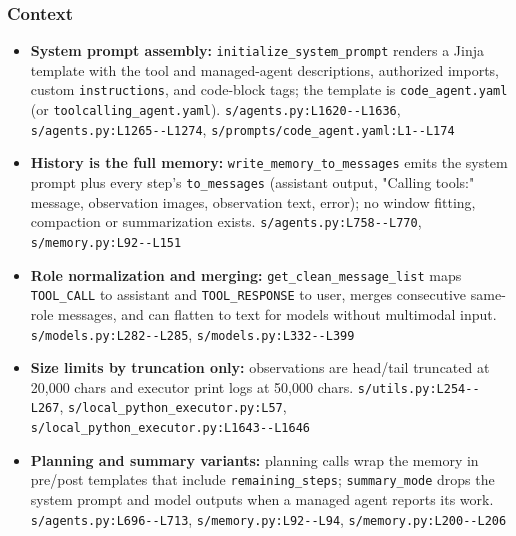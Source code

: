 \subsubsection*{Context}
\begin{itemize}
\item \textbf{System prompt assembly:} \texttt{initialize\_\allowbreak{}system\_\allowbreak{}prompt} renders a Jinja template with the tool and managed-agent descriptions, authorized imports, custom \texttt{instructions}, and code-block tags; the template is \texttt{code\_\allowbreak{}agent.\allowbreak{}yaml} (or \texttt{toolcalling\_\allowbreak{}agent.\allowbreak{}yaml}). \texttt{s/\allowbreak{}agents.\allowbreak{}py:\allowbreak{}L1620-\allowbreak{}-\allowbreak{}L1636}, \texttt{s/\allowbreak{}agents.\allowbreak{}py:\allowbreak{}L1265-\allowbreak{}-\allowbreak{}L1274}, \texttt{s/\allowbreak{}prompts/\allowbreak{}code\_\allowbreak{}agent.\allowbreak{}yaml:\allowbreak{}L1-\allowbreak{}-\allowbreak{}L174}
\item \textbf{History is the full memory:} \texttt{write\_\allowbreak{}memory\_\allowbreak{}to\_\allowbreak{}messages} emits the system prompt plus every step's \texttt{to\_\allowbreak{}messages} (assistant output, "Calling tools:" message, observation images, observation text, error); no window fitting, compaction or summarization exists. \texttt{s/\allowbreak{}agents.\allowbreak{}py:\allowbreak{}L758-\allowbreak{}-\allowbreak{}L770}, \texttt{s/\allowbreak{}memory.\allowbreak{}py:\allowbreak{}L92-\allowbreak{}-\allowbreak{}L151}
\item \textbf{Role normalization and merging:} \texttt{get\_\allowbreak{}clean\_\allowbreak{}message\_\allowbreak{}list} maps \texttt{TOOL\_\allowbreak{}CALL} to assistant and \texttt{TOOL\_\allowbreak{}RESPONSE} to user, merges consecutive same-role messages, and can flatten to text for models without multimodal input. \texttt{s/\allowbreak{}models.\allowbreak{}py:\allowbreak{}L282-\allowbreak{}-\allowbreak{}L285}, \texttt{s/\allowbreak{}models.\allowbreak{}py:\allowbreak{}L332-\allowbreak{}-\allowbreak{}L399}
\item \textbf{Size limits by truncation only:} observations are head/tail truncated at 20,000 chars and executor print logs at 50,000 chars. \texttt{s/\allowbreak{}utils.\allowbreak{}py:\allowbreak{}L254-\allowbreak{}-\allowbreak{}L267}, \texttt{s/\allowbreak{}local\_\allowbreak{}python\_\allowbreak{}executor.\allowbreak{}py:\allowbreak{}L57}, \texttt{s/\allowbreak{}local\_\allowbreak{}python\_\allowbreak{}executor.\allowbreak{}py:\allowbreak{}L1643-\allowbreak{}-\allowbreak{}L1646}
\item \textbf{Planning and summary variants:} planning calls wrap the memory in pre/post templates that include \texttt{remaining\_\allowbreak{}steps}; \texttt{summary\_\allowbreak{}mode} drops the system prompt and model outputs when a managed agent reports its work. \texttt{s/\allowbreak{}agents.\allowbreak{}py:\allowbreak{}L696-\allowbreak{}-\allowbreak{}L713}, \texttt{s/\allowbreak{}memory.\allowbreak{}py:\allowbreak{}L92-\allowbreak{}-\allowbreak{}L94}, \texttt{s/\allowbreak{}memory.\allowbreak{}py:\allowbreak{}L200-\allowbreak{}-\allowbreak{}L206}
\end{itemize}

